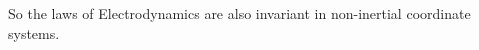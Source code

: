 \documentclass{article}
\theoremstyle{definition}
\theoremstyle{remark}
\renewcommand{\vec}[1]{\mathbf{#1}}
\begin{document}
%
%
%
%
\begin{comment}
\begin{equation}\label{noninchtht}
\begin{cases}
\vec x'=A(t)\cdot \vec x+\vec z(t),\\
t'=t,
\end{cases}
\end{equation}
\begin{equation}\label{yuythfgfyftydtydtydtyddyyyhhddhhh}
\begin{cases}
\vec D'=A(t)\cdot \vec D\\
\vec B'=A(t)\cdot\vec B\\
\vec E'=A(t)\cdot\vec E-\frac{1}{c}\,\left(A'(t)\cdot\vec x+\vec
w(t)\right)\times \left(A(t)\cdot\vec B\right)\\
\vec H'=A(t)\cdot\vec H+\frac{1}{c}\,\left(A'(t)\cdot\vec x+\vec
w(t)\right)\times \left(A(t)\cdot\vec D\right),
\end{cases}
\end{equation}
\begin{equation}\label{yuythfgfyftydtydtydtyddyyyhhddhhh}
\begin{cases}
\vec D'=A(t)\cdot \vec D,\\
\vec B'=A(t)\cdot\vec B,\\
\vec E'=A(t)\cdot\vec E-\frac{1}{c}\,\left(A'(t)\cdot\vec x+\vec
w(t)\right)\times \left(A(t)\cdot\vec B\right),\\
\vec H'=A(t)\cdot\vec H+\frac{1}{c}\,\left(A'(t)\cdot\vec x+\vec
w(t)\right)\times \left(A(t)\cdot\vec D\right).
\end{cases}
\end{equation}
where $\vec w(t)=\vec z'(t)$.
\end{comment}
%
%
%
%






So the laws of Electrodynamics are also invariant in non-inertial
coordinate systems.
\end{document}
